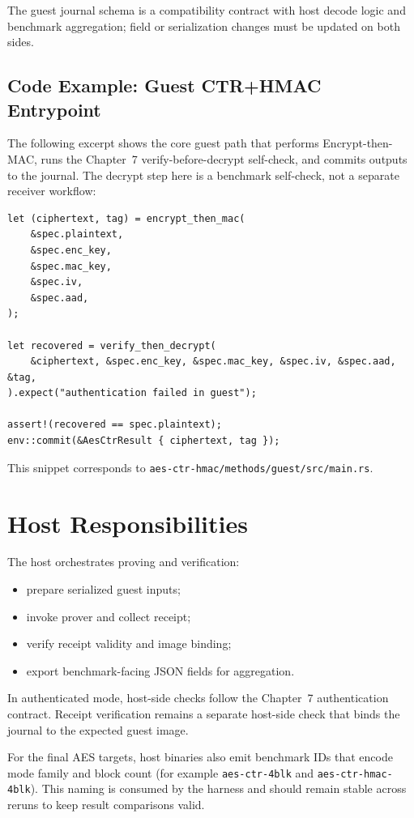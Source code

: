 The guest journal schema is a compatibility contract with host decode logic and
benchmark aggregation; field or serialization changes must be updated on both
sides.

\subsection*{Code Example: Guest CTR+HMAC Entrypoint}

The following excerpt shows the core guest path that performs Encrypt-then-MAC,
runs the Chapter~7 verify-before-decrypt self-check, and commits outputs to the
journal. The decrypt step here is a benchmark self-check, not a separate receiver
workflow:

\begin{verbatim}
let (ciphertext, tag) = encrypt_then_mac(
    &spec.plaintext,
    &spec.enc_key,
    &spec.mac_key,
    &spec.iv,
    &spec.aad,
);

let recovered = verify_then_decrypt(
    &ciphertext, &spec.enc_key, &spec.mac_key, &spec.iv, &spec.aad, &tag,
).expect("authentication failed in guest");

assert!(recovered == spec.plaintext);
env::commit(&AesCtrResult { ciphertext, tag });
\end{verbatim}

This snippet corresponds to
\texttt{aes-ctr-hmac/methods/guest/src/main.rs}.

\section{Host Responsibilities}

The host orchestrates proving and verification:

\begin{itemize}
\item prepare serialized guest inputs;
\item invoke prover and collect receipt;
\item verify receipt validity and image binding;
\item export benchmark-facing JSON fields for aggregation.
\end{itemize}

In authenticated mode, host-side checks follow the Chapter~7 authentication
contract. Receipt verification remains a separate host-side check that binds the
journal to the expected guest image.

For the final AES targets, host binaries also emit benchmark IDs that encode
mode family and block count (for example \texttt{aes-ctr-4blk} and
\texttt{aes-ctr-hmac-4blk}). This naming is consumed by the harness and should
remain stable across reruns to keep result comparisons valid.

